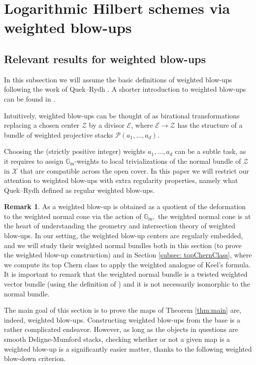 \documentclass[10.5pt]{amsart}
\theoremstyle{definition}
\theoremstyle{definition}
\theoremstyle{definition}
\theoremstyle{definition}
\newtheorem{remark}[theorem]{Remark}
\newcommand{\Gm}{\mathbb{G}_{\operatorname{m}}}
\newcommand{\cZ}{\mathcal{Z}}
\newcommand{\cE}{\mathcal{E}}
\newcommand{\cP}{\mathcal{P}}
\newcommand{\cX}{\mathcal{X}}
\begin{document}
\section{Logarithmic Hilbert schemes via weighted blow-ups}\label{sec:wbu}



\subsection{Relevant results for weighted blow-ups}
In this subsection we will assume the basic definitions of weighted blow-ups following the work of Quek--Rydh \cite{quek-rydh-weighted-blow-up}. A shorter introduction to weighted blow-ups can be found in \cite{arena2024criterion}.

Intuitively, weighted blow-ups can be thought of as birational transformations replacing a chosen center $\cZ$ by a divisor $\cE$, where $\cE \to \cZ$ has the structure of a bundle of weighted projective stacks $\cP(a_1,\dots,a_d)$. 

Choosing the (strictly positive integer) weights $a_1,\dots,a_d$ can be a subtle task, as it requires to assign $\Gm$-weights to local trivializations of the normal bundle of $\cZ$ in $\cX$ that are compatible across the open cover. In this paper we will restrict our attention to weighted blow-ups with extra regularity properties, namely what Quek--Rydh defined as regular weighted blow-ups.


\begin{remark}
    As a weighted blow-up is obtained as a quotient of the deformation to the weighted normal cone via the action of $\Gm,$ the weighted normal cone is at the heart of understanding the geometry and intersection theory of weighted blow-ups. In our setting, the weighted blow-up centers are regularly embedded, and we will study their weighted normal bundles both in this section (to prove the weighted blow-up construction) and in Section \ref{subsec: topChernClass}, where we compute its top Chern class to apply the weighted analogue of Keel's formula. It is important to remark that the weighted normal bundle is a twisted weighted vector bundle (using the definition of \cite{quek-rydh-weighted-blow-up}) and it is not necessarily isomorphic to the normal bundle.
\end{remark}


The main goal of this section is to prove the maps of Theorem \ref{thm:main} are, indeed, weighted blow-ups. Constructing weighted blow-ups from the base is a rather complicated endeavor. However, as long as the objects in questions are smooth Deligne-Mumford stacks, checking whether or not a given map is a weighted blow-up is a significantly easier matter, thanks to the following weighted blow-down criterion.
\end{document}
